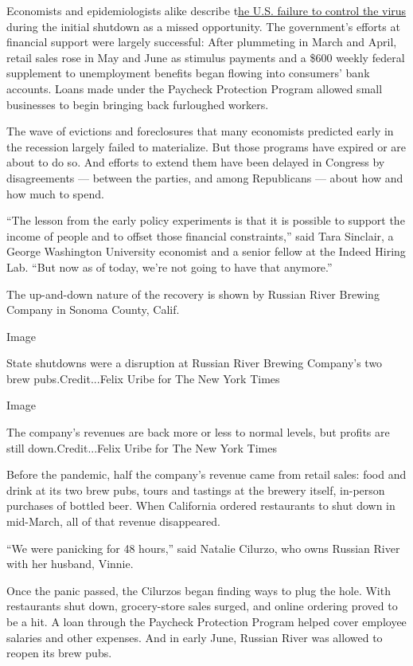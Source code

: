 Economists and epidemiologists alike describe
t\href{https://www.nytimes.com/2020/07/18/us/politics/trump-coronavirus-response-failure-leadership.html}{he
U.S. failure to control the virus} during the initial shutdown as a
missed opportunity. The government's efforts at financial support were
largely successful: After plummeting in March and April, retail sales
rose in May and June as stimulus payments and a \$600 weekly federal
supplement to unemployment benefits began flowing into consumers' bank
accounts. Loans made under the Paycheck Protection Program allowed small
businesses to begin bringing back furloughed workers.

The wave of evictions and foreclosures that many economists predicted
early in the recession largely failed to materialize. But those programs
have expired or are about to do so. And efforts to extend them have been
delayed in Congress by disagreements --- between the parties, and among
Republicans --- about how and how much to spend.

``The lesson from the early policy experiments is that it is possible to
support the income of people and to offset those financial
constraints,'' said Tara Sinclair, a George Washington University
economist and a senior fellow at the Indeed Hiring Lab. ``But now as of
today, we're not going to have that anymore.''

The up-and-down nature of the recovery is shown by Russian River Brewing
Company in Sonoma County, Calif.

Image

State shutdowns were a disruption at Russian River Brewing Company's two
brew pubs.Credit...Felix Uribe for The New York Times

Image

The company's revenues are back more or less to normal levels, but
profits are still down.Credit...Felix Uribe for The New York Times

Before the pandemic, half the company's revenue came from retail sales:
food and drink at its two brew pubs, tours and tastings at the brewery
itself, in-person purchases of bottled beer. When California ordered
restaurants to shut down in mid-March, all of that revenue disappeared.

``We were panicking for 48 hours,'' said Natalie Cilurzo, who owns
Russian River with her husband, Vinnie.

Once the panic passed, the Cilurzos began finding ways to plug the hole.
With restaurants shut down, grocery-store sales surged, and online
ordering proved to be a hit. A loan through the Paycheck Protection
Program helped cover employee salaries and other expenses. And in early
June, Russian River was allowed to reopen its brew pubs.

